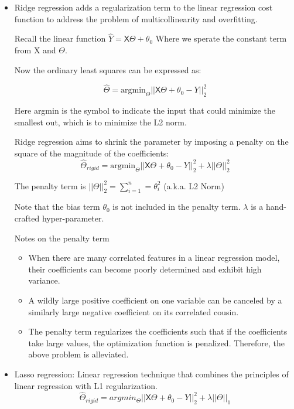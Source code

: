 \documentclass[letterpaper,12pt]{article}
\begin{document}
\begin{itemize}
    \item Ridge regression adds a regularization term to the linear regression cost
          function to address the problem of multicollinearity and overfitting.

          Recall the linear function $\hat{Y}=\mathsf{X}\Theta+\theta_0$ Where we sperate
          the constant term from X and $\Theta$.

          Now the ordinary least squares can be expressed as:

          \[
              \hat{\Theta}=\text{argmin}_\Theta||\mathsf{X}\Theta+\theta_0-Y||_2^2
          \]

          Here argmin is the symbol to indicate the input that could minimize the
          smallest out, which is to minimize the L2 norm.

          Ridge regression aims to shrink the parameter by imposing a penalty on the square of
          the magnitude of the coefficients:
          \[
              \hat{\Theta}_{rigid}=\text{argmin}_\Theta||\mathsf{X}\Theta+\theta_0-Y||_2^2 + \lambda||\Theta||_2^2
          \]

          The penalty term is $||\Theta||_2^2=\sum_{i=1}^{n}=\theta_i^2$ (a.k.a. L2 Norm)

          Note that the bias term $\theta_0$ is not included in the penalty term.
          $\lambda$ is a hand-crafted hyper-parameter.

          Notes on the penalty term
          \begin{itemize}
              \item When there are many correlated features in a linear regression model, their
                    coefficients can become poorly determined and exhibit high variance.
              \item A wildly large positive coefficient on one variable can be canceled by a
                    similarly large negative coefficient on its correlated cousin.
              \item The penalty term regularizes the coefficients such that if the coefficients
                    take large values, the optimization function is penalized. Therefore, the above
                    problem is alleviated.
          \end{itemize}

    \item Lasso regression: Linear regression technique that combines the principles of
          linear regression with L1 regularization.
          \[
              \hat{\Theta}_{rigid}=argmin_\Theta||\mathsf{X}\Theta+\theta_0-Y||_2^2 + \lambda||\Theta||_1
          \]


\end{itemize}
\end{document}
